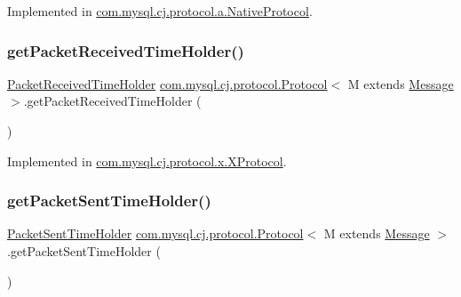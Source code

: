 Implemented in \mbox{\hyperlink{classcom_1_1mysql_1_1cj_1_1protocol_1_1a_1_1_native_protocol_abded3c4e676d3558746c88ee5d206dda}{com.\+mysql.\+cj.\+protocol.\+a.\+Native\+Protocol}}.

\mbox{\label{interfacecom_1_1mysql_1_1cj_1_1protocol_1_1_protocol_a68bc036cd22a70fe8947ed43339c4fa0}} 
\subsubsection{\texorpdfstring{get\+Packet\+Received\+Time\+Holder()}{getPacketReceivedTimeHolder()}}
{\footnotesize\ttfamily \mbox{\hyperlink{interfacecom_1_1mysql_1_1cj_1_1protocol_1_1_packet_received_time_holder}{Packet\+Received\+Time\+Holder}} \mbox{\hyperlink{interfacecom_1_1mysql_1_1cj_1_1protocol_1_1_protocol}{com.\+mysql.\+cj.\+protocol.\+Protocol}}$<$ M extends \mbox{\hyperlink{interfacecom_1_1mysql_1_1cj_1_1protocol_1_1_message}{Message}} $>$.get\+Packet\+Received\+Time\+Holder (\begin{DoxyParamCaption}{ }\end{DoxyParamCaption})}



Implemented in \mbox{\hyperlink{classcom_1_1mysql_1_1cj_1_1protocol_1_1x_1_1_x_protocol_a67b0b956239ad6b2a4d455c2b62d0050}{com.\+mysql.\+cj.\+protocol.\+x.\+X\+Protocol}}.

\mbox{\label{interfacecom_1_1mysql_1_1cj_1_1protocol_1_1_protocol_a412e8ba9beb161548f142a1178c910d2}} 
\subsubsection{\texorpdfstring{get\+Packet\+Sent\+Time\+Holder()}{getPacketSentTimeHolder()}}
{\footnotesize\ttfamily \mbox{\hyperlink{interfacecom_1_1mysql_1_1cj_1_1protocol_1_1_packet_sent_time_holder}{Packet\+Sent\+Time\+Holder}} \mbox{\hyperlink{interfacecom_1_1mysql_1_1cj_1_1protocol_1_1_protocol}{com.\+mysql.\+cj.\+protocol.\+Protocol}}$<$ M extends \mbox{\hyperlink{interfacecom_1_1mysql_1_1cj_1_1protocol_1_1_message}{Message}} $>$.get\+Packet\+Sent\+Time\+Holder (\begin{DoxyParamCaption}{ }\end{DoxyParamCaption})}



